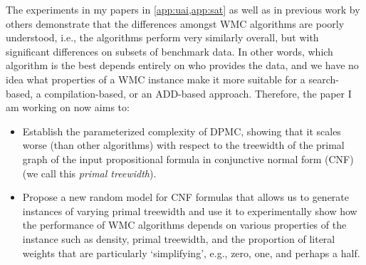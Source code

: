\documentclass{article}
\begin{document}
The experiments in my papers in \cref{app:uai,app:sat} as well as in previous
work by others \cite{DBLP:conf/aaai/DudekPV20,DBLP:conf/cp/DudekPV20}
demonstrate that the differences amongst WMC algorithms are poorly understood,
i.e., the algorithms perform very similarly overall, but with significant
differences on subsets of benchmark data. In other words, which algorithm is the
best depends entirely on who provides the data, and we have no idea what
properties of a WMC instance make it more suitable for a search-based,
a compilation-based, or an ADD-based approach. Therefore, the paper I am working
on now aims to:
\begin{itemize}
\item Establish the parameterized complexity of DPMC, showing that it scales
  worse (than other algorithms) with respect to the treewidth of the primal
  graph of the input propositional formula in conjunctive normal form (CNF) (we
  call this \emph{primal treewidth}).
\item Propose a new random model for CNF formulas that allows us to generate
  instances of varying primal treewidth and use it to experimentally show how
  the performance of WMC algorithms depends on various properties of the
  instance such as density, primal treewidth, and the proportion of literal
  weights that are particularly `simplifying', e.g., zero, one, and perhaps a
  half.
\end{itemize}
\end{document}
